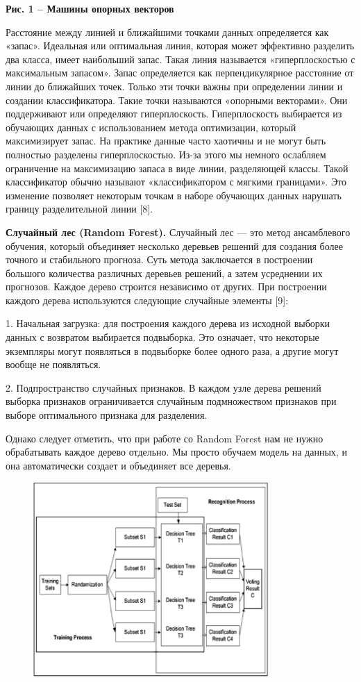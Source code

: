 {\bfseries Рис. 1 -- Машины опорных векторов}

Расстояние между линией и ближайшими точками данных определяется как
«запас». Идеальная или оптимальная линия, которая может эффективно
разделить два класса, имеет наибольший запас. Такая линия называется
«гиперплоскостью с максимальным запасом». Запас определяется как
перпендикулярное расстояние от линии до ближайших точек. Только эти
точки важны при определении линии и создании классификатора. Такие точки
называются «опорными векторами». Они поддерживают или определяют
гиперплоскость. Гиперплоскость выбирается из обучающих данных с
использованием метода оптимизации, который максимизирует запас. На
практике данные часто хаотичны и не могут быть полностью разделены
гиперплоскостью. Из-за этого мы немного ослабляем ограничение на
максимизацию запаса в виде линии, разделяющей классы. Такой
классификатор обычно называют «классификатором с мягкими границами». Это
изменение позволяет некоторым точкам в наборе обучающих данных нарушать
границу разделительной линии {[}8{]}.

{\bfseries Случайный лес (Random Forest).} Случайный лес --- это метод
ансамблевого обучения, который объединяет несколько деревьев решений для
создания более точного и стабильного прогноза. Суть метода заключается в
построении большого количества различных деревьев решений, а затем
усреднении их прогнозов. Каждое дерево строится независимо от других.
При построении каждого дерева используются следующие случайные элементы
{[}9{]}:

1. Начальная загрузка: для построения каждого дерева из исходной выборки
данных с возвратом выбирается подвыборка. Это означает, что некоторые
экземпляры могут появляться в подвыборке более одного раза, а другие
могут вообще не появляться.

2. Подпространство случайных признаков. В каждом узле дерева решений
выборка признаков ограничивается случайным подмножеством признаков при
выборе оптимального признака для разделения.

Однако следует отметить, что при работе со Random Forest нам не нужно
обрабатывать каждое дерево отдельно. Мы просто обучаем модель на данных,
и она автоматически создает и объединяет все деревья.

\begin{figure}[H]
	\centering
	\includegraphics[width=0.8\textwidth]{assets/111}
	\caption*{}
\end{figure}

